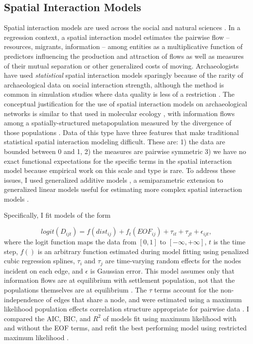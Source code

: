 \documentclass[10pt]{iopart}
\begin{document}
\subsection*{Spatial Interaction Models}
Spatial interaction models are used across the social and natural sciences \parencite{Wilson1971,Fotheringham1989,Sen1995,Bavaud2008,Murphy2010,Head2015}. In a regression context, a spatial interaction model estimates the pairwise flow -- resources, migrants, information -- among entities as a multiplicative function of predictors influencing the production and attraction of flows as well as measures of their mutual separation or other generalized costs of moving. Archaeologists have used \textit{statistical} spatial interaction models sparingly \parencite{Tobler1971,Hodder1974,Johnson1990ChumashAnalysis} because of the rarity of archaeological data on social interaction strength, although the method is common in simulation studies where data quality is less of a restriction \parencite{Bevan2013, Evans2011, Davies2014,Paliou2016}. The conceptual justification for the use of spatial interaction models on archaeological networks is similar to that used in molecular ecology \parencite{Murphy2010}, with information flows among a spatially-structured metapopulation measured by the divergence of those populations \parencite{Mesoudi2018}. Data of this type have three features that make traditional statistical spatial interaction modeling difficult. These are: 1) the data are bounded between 0 and 1, 2) the measures are pairwise symmetric 3) we have no exact functional expectations for the specific terms in the spatial interaction model because empirical work on this scale and type is rare. To address these issues, I used generalized additive models \parencite{Wood2006a}, a semiparametric extension to generalized linear models useful for estimating more complex spatial interaction models \parencite{Lebacher2018}.

Specifically, I fit models of the form

\begin{equation}
    logit\left(D_{ijt}\right) = f(dist_{ij}) + f_t(EOF_{ij}) + \tau_{it} + \tau_{jt} + \epsilon_{ijt},
\end{equation}
where the logit function maps the data from $[0, 1]$ to $[-\infty, +\infty]$, $t$ is the time step, $f()$ is an arbitrary function estimated during model fitting using penalized cubic regression splines, $\tau_i$ and $\tau_j$ are time-varying random effects for the nodes incident on each edge, and $\epsilon$ is Gaussian error. This model assumes only that information flows are at equilibrium with settlement population, not that the populations themselves are at equilibrium \parencite{Wilson2008}. The $\tau$ terms account for the non-independence of edges that share a node, and were estimated using a maximum likelihood population effects correlation structure appropriate for pairwise data \parencite{Clarke2002}. I compared the AIC, BIC, and $R^2$ of models fit using maximum likelihood with and without the EOF terms, and refit the best performing model using restricted maximum likelihood \parencite{Clarke2002,Shirk2018}. 
\end{document}
